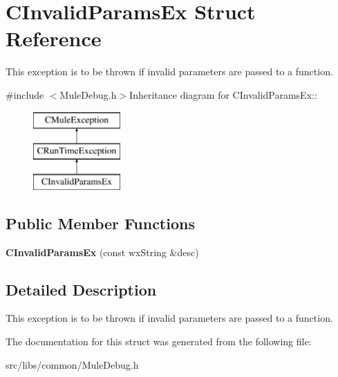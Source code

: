 \section{CInvalidParamsEx Struct Reference}
\label{structCInvalidParamsEx}


This exception is to be thrown if invalid parameters are passed to a function.  


{\ttfamily \#include $<$MuleDebug.h$>$}Inheritance diagram for CInvalidParamsEx::\begin{figure}[H]
\begin{center}
\leavevmode
\includegraphics[height=3cm]{structCInvalidParamsEx}
\end{center}
\end{figure}
\subsection*{Public Member Functions}
\begin{DoxyCompactItemize}
\item 
{\bfseries CInvalidParamsEx} (const wxString \&desc)\label{structCInvalidParamsEx_a57b866568366d897f453c5bbb0b2bd08}

\end{DoxyCompactItemize}


\subsection{Detailed Description}
This exception is to be thrown if invalid parameters are passed to a function. 

The documentation for this struct was generated from the following file:\begin{DoxyCompactItemize}
\item 
src/libs/common/MuleDebug.h\end{DoxyCompactItemize}

